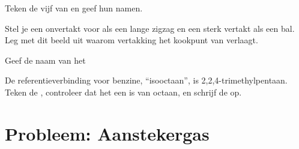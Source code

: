 \begin{exercise}[$\star\star\star$]\label{exo:g11:organic-skeletons:12}
Teken de vijf  van  en geef hun namen.
\end{exercise}

\begin{exercise}[$\star\star\star$]\label{exo:g11:organic-skeletons:13}
Stel je een onvertakt  voor als een lange zigzag en een sterk
vertakt  als een bal. Leg met dit beeld uit waarom vertakking het
kookpunt van  verlaagt.
\end{exercise}

\begin{exercise}[$\star\star\star$]\label{exo:g11:organic-skeletons:14}
Geef de naam van het 
\begin{center}
\end{center}
\end{exercise}

\begin{exercise}[$\star\star\star$]\label{exo:g11:organic-skeletons:15}
De referentieverbinding voor benzine, ``isooctaan'', is
2,2,4-trimethylpentaan. Teken de , controleer dat het een
 is van octaan, en schrijf de  op.
\end{exercise}

\section{Probleem: Aanstekergas}

